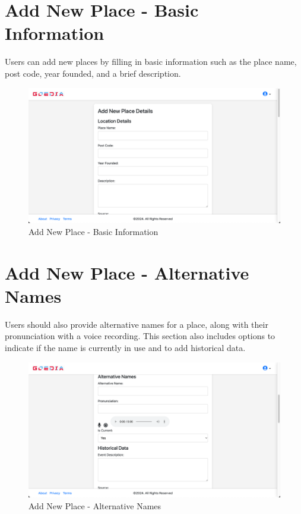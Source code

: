 \section{Add New Place - Basic Information}
Users can add new places by filling in basic information such as the place name, post code, year founded, and a brief description.

\begin{figure}[H]
    \centering
    \includegraphics[width=\textwidth]{addnewPlace.png}
    \caption{Add New Place - Basic Information}
    \label{fig:addnewPlace}
\end{figure}

\section{Add New Place - Alternative Names}
Users should also provide alternative names for a place, along with their pronunciation with a voice recording. This section also includes options to indicate if the name is currently in use and to add historical data.

\begin{figure}[H]
    \centering
    \includegraphics[width=\textwidth]{addnewPlaceAlternativeName.png}
    \caption{Add New Place - Alternative Names}
    \label{fig:addnewPlaceAlternativeName}
\end{figure}

